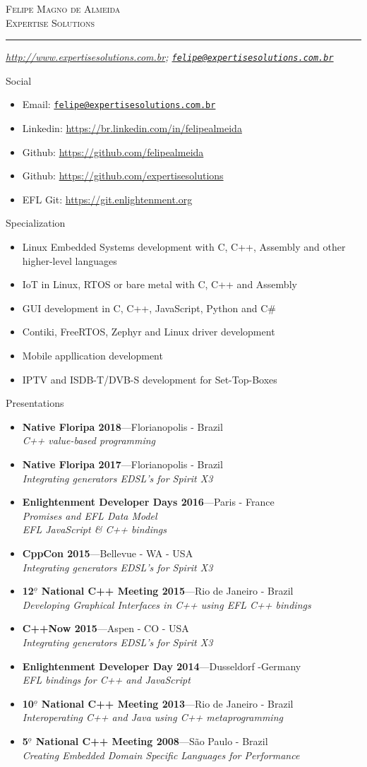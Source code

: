 \documentclass[10pt,oneside]{article}
\makeatletter
\newcommand{\name}{Felipe Magno de Almeida\\Expertise Solutions}
\newcommand{\addr}{}
\newcommand{\phone}{\url{http://www.expertisesolutions.com.br}}
\newcommand{\email}{\href{mailto:felipe@expertisesolutions.com.br}{\nolinkurl{felipe@expertisesolutions.com.br}}}
\newcommand{\bigname}[1]{
	\begin{center}\fontfamily{phv}\selectfont\Huge\scshape#1\end{center}
}
\newenvironment{ressection}[1]{
	\vspace{4pt}
	{\fontfamily{phv}\selectfont\Large#1}
	\begin{itemize}
	\vspace{3pt}
}{
	\end{itemize}
}
\newcommand{\resitem}[1]{
	\vspace{-4pt}
	\item \begin{flushleft} #1 \end{flushleft}
}
\newcommand{\resbigitem}[3]{
	\vspace{-5pt}
	\item
	\textbf{#1}---#2 \\
	\textit{#3}
}
\makeatother
\begin{document}
 \selectfont

\bigname{\name}

\vspace{-8pt} \rule{\textwidth}{1pt}

\vspace{-1pt} {\small\itshape \addr \hfill \phone; \email}

\vspace{8 pt}

\begin{ressection}{Social}
  \resitem{Email: \href{mailto:felipe@expertisesolutions.com.br}{\nolinkurl{felipe@expertisesolutions.com.br}}}
  \resitem{Linkedin: \url{https://br.linkedin.com/in/felipealmeida}}
  \resitem{Github: \url{https://github.com/felipealmeida}}
  \resitem{Github: \url{https://github.com/expertisesolutions}}
  \resitem{EFL Git: \url{https://git.enlightenment.org}}
\end{ressection}


\begin{ressection}{Specialization}
        \resitem{Linux Embedded Systems development with C, C++,
          Assembly and other higher-level languages}
        \resitem{IoT in Linux, RTOS or bare metal with C, C++ and Assembly}
	\resitem{GUI development in C, C++, JavaScript, Python and C\#}
        \resitem{Contiki, FreeRTOS, Zephyr and Linux driver development}
        \resitem{Mobile appllication development}
        \resitem{IPTV and ISDB-T/DVB-S development for Set-Top-Boxes}
\end{ressection}


\begin{ressection}{Presentations}
  \resbigitem{Native Floripa 2018}{Florianopolis -
    Brazil}{C++ value-based programming}
  \resbigitem{Native Floripa 2017}{Florianopolis -
    Brazil}{Integrating generators EDSL's for Spirit X3}
  \resbigitem{Enlightenment Developer Days 2016}{Paris -
    France}{Promises and EFL Data Model \\ EFL JavaScript \& C++ bindings}
  \resbigitem{CppCon 2015}{Bellevue - WA -  USA}{Integrating generators EDSL's for Spirit X3}
  \resbigitem{12$^{\underline{o}}$ National C++ Meeting 2015}{Rio de Janeiro -
    Brazil}{Developing Graphical Interfaces in C++ using EFL C++ bindings}
  \resbigitem{C++Now 2015}{Aspen - CO - USA}{Integrating generators EDSL's for Spirit X3}
  \resbigitem{Enlightenment Developer Day 2014}{Dusseldorf -Germany}{EFL bindings for C++
    and JavaScript}
  \resbigitem{10$^{\underline{o}}$ National C++ Meeting 2013}{Rio de Janeiro -
    Brazil}{Interoperating C++ and Java using C++ metaprogramming}
  \resbigitem{5$^{\underline{o}}$ National C++ Meeting 2008}{São Paulo -
    Brazil}{Creating Embedded Domain Specific Languages for Performance}
\end{ressection}
\end{document}
